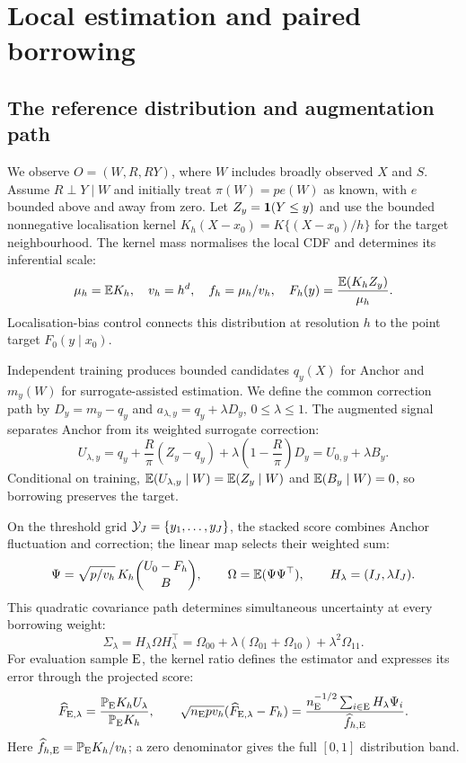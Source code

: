 \section{Local estimation and paired borrowing}
\subsection{The reference distribution and augmentation path}
We observe $O=(W,R,RY)$, where $W$ includes broadly observed $X$ and $S$.
Assume $R\perp Y\mid W$ and initially treat $\pi(W)=p e(W)$ as known, with $e$ bounded above and away from zero.
Let $Z_y=\mathbf 1(Y\leq y)$ and use the bounded nonnegative localisation kernel $K_h(X-x_0)=K\{(X-x_0)/h\}$ for the target neighbourhood.
The kernel mass normalises the local CDF and determines its inferential scale:
\begin{equation}\label{eq:target}
 \mu_h=\mathbb E K_h,\quad v_h=h^d,\quad f_h=\mu_h/v_h,\quad
 F_h(y)=\frac{\mathbb E(K_hZ_y)}{\mu_h}.
\end{equation}
Localisation-bias control connects this distribution at resolution $h$ to the point target $F_0(y\mid x_0)$.

Independent training produces bounded candidates $q_y(X)$ for Anchor and $m_y(W)$ for surrogate-assisted estimation.
We define the common correction path by $D_y=m_y-q_y$ and $a_{\lambda,y}=q_y+\lambda D_y$, $0\leq\lambda\leq1$.
The augmented signal separates Anchor from its weighted surrogate correction:
\begin{equation}\label{eq:signal}
 U_{\lambda,y}=q_y+\frac R\pi(Z_y-q_y)
       +\lambda\left(1-\frac R\pi\right)D_y
       =U_{0,y}+\lambda B_y.
\end{equation}
Conditional on training, $\mathbb E(U_{\lambda,y}\mid W)=\mathbb E(Z_y\mid W)$ and $\mathbb E(B_y\mid W)=0$, so borrowing preserves the target.

On the threshold grid $\mathcal Y_J=\{y_1,\ldots,y_J\}$, the stacked score combines Anchor fluctuation and correction; the linear map selects their weighted sum:
\begin{equation}\label{eq:psi}
 \Psi=\sqrt{p/v_h}\,K_h
       \binom{U_0-F_h}{B},\qquad
 \Omega=\mathbb E(\Psi\Psi^\top),\qquad H_\lambda=(I_J,\lambda I_J).
\end{equation}
This quadratic covariance path determines simultaneous uncertainty at every borrowing weight:
\begin{equation}\label{eq:path}
 \Sigma_\lambda=H_\lambda\Omega H_\lambda^\top
 =\Omega_{00}+\lambda(\Omega_{01}+\Omega_{10})+\lambda^2\Omega_{11}.
\end{equation}
For evaluation sample $\mathrm{E}$, the kernel ratio defines the estimator and expresses its error through the projected score:
\begin{equation}\label{eq:identity}
 \widehat F_{\mathrm{E},\lambda}=\frac{\mathbb P_{\mathrm{E}}K_hU_\lambda}{\mathbb P_{\mathrm{E}}K_h},\qquad
 \sqrt{n_{\mathrm{E}}pv_h}(\widehat F_{\mathrm{E},\lambda}-F_h)
 =\frac{n_{\mathrm{E}}^{-1/2}\sum_{i\in\mathrm{E}}H_\lambda\Psi_i}{\widehat f_{h,\mathrm{E}}}.
\end{equation}
Here $\widehat f_{h,\mathrm{E}}=\mathbb P_{\mathrm{E}}K_h/v_h$; a zero denominator gives the full $[0,1]$ distribution band.

